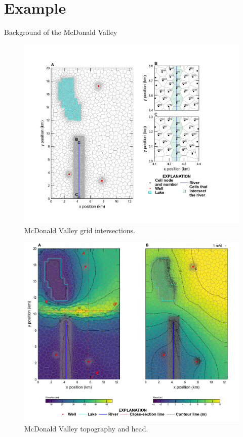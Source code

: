 \documentclass[11pt, oneside]{article}   	%
\begin{document}
\lipsum[2-4]

\section{Example}

Background of the McDonald Valley

\lipsum[12-18]

\begin{figure}[ht!]
	\begin{center}
		\includegraphics{figures/mv_voronoi_river_discretization.png}
	\end{center}
	\caption{McDonald Valley grid intersections.}
	\label{fig:mvgrid}
\end{figure}

\lipsum[2-4]

\begin{figure}[ht!]
	\begin{center}
		\includegraphics{figures/mv_voronoi_map.png}
	\end{center}
	\caption{McDonald Valley topography and head.}
	\label{fig:mvmap}
\end{figure}
\end{document}
